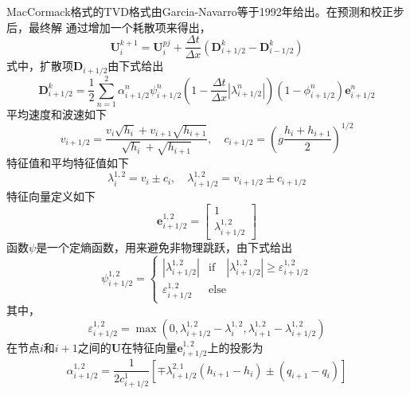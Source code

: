 MacCormack格式的TVD格式由Garcia-Navarro等于1992年给出。在预测和校正步后，最终解
通过增加一个耗散项来得出，
\begin{equation}
  \mathbf{U}_{i}^{k+1} =
  \mathbf{U}_{i}^{pj} +
  \frac{\Delta t}{\Delta x}
  \left(
    \mathbf{D}_{i+1/2}^{k} -
    \mathbf{D}_{i-1/2}^{k}
  \right)
\end{equation}
式中，扩散项$\mathbf{D}_{i+1/2}$由下式给出
\begin{equation}
  \mathbf{D}_{i+1/2}^{k} =
  \frac{1}{2}
  \sum_{n=1}^{2}
  \alpha_{i+1/2}^{n}
  \psi_{i+1/2}^{n}
  \left(
    1 - 
    \frac{\Delta t}{\Delta x}
    \left|
    \lambda_{i+1/2}^{n}
    \right|
  \right)
  \left(
    1-\phi_{i+1/2}^{n}
  \right)
  \mathbf{e}_{i+1/2}^{n}
\end{equation}
平均速度和波速如下
\begin{equation}
  v_{i+1/2} = 
  \frac
  {v_{i}\sqrt{h_{i}} + v_{i+1}\sqrt{h_{i+1}}}
  {\sqrt{h_{i}}+\sqrt{h_{i+1}}}
  ,\quad
  c_{i+1/2} =
  \left(
    g 
    \frac{h_{i}+h_{i+1}}{2}
  \right)^{1/2}
\end{equation}
特征值和平均特征值如下
\begin{equation}
  \lambda_{i}^{1,2} = v_{i}\pm c_{i}
  ,\quad
  \lambda_{i+1/2}^{1,2} = v_{i+1/2}\pm c_{i+1/2}
\end{equation}
特征向量定义如下
\begin{equation}
  \mathbf{e}_{i+1/2}^{1,2} 
  =
  \begin{bmatrix}
    1 \\
    \lambda_{i+1/2}^{1,2}
  \end{bmatrix}
\end{equation}
函数$\psi$是一个定熵函数，用来避免非物理跳跃，由下式给出
\begin{equation}
  \psi_{i+1/2}^{1,2} =
  \begin{cases}
    |\lambda_{i+1/2}^{1,2}| & \mathrm{if} \quad |\lambda_{i+1/2}^{1,2}| \ge \varepsilon_{i+1/2}^{1,2} \\
    \varepsilon_{i+1/2}^{1,2} & \mathrm{else}
  \end{cases}
\end{equation}
其中，
\begin{equation}
\varepsilon_{i+1/2}^{1,2} =
\max 
\left(
  0,
  \lambda_{i+1/2}^{1,2} - \lambda_{i}^{1,2},
  \lambda_{i+1}^{1,2} - \lambda_{i+1/2}^{1,2}
\right)
\end{equation}
在节点$i$和$i+1$之间的$\mathbf{U}$在特征向量$\mathbf{e}_{i+1/2}^{1,2}$上的投影为
\begin{equation}
\alpha_{i+1/2}^{1,2} = 
\frac{1}{2c_{i+1/2}^{1}}
\left[
  \mp\lambda_{i+1/2}^{2,1}(h_{i+1}-h_{i})
  \pm
  (q_{i+1} - q_{i})
\right]
\end{equation}

